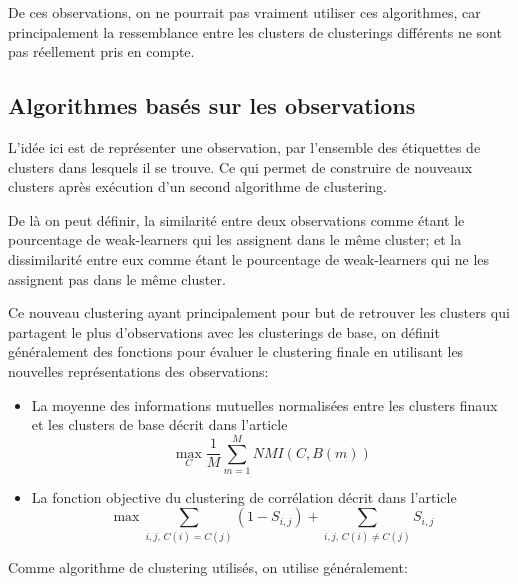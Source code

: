 \documentclass[12pt, french, latin.medieval, a4paper]{report}
\begin{document}
    De ces observations, on ne pourrait pas vraiment utiliser ces algorithmes,
     car principalement la ressemblance entre les clusters de clusterings différents ne sont pas réellement pris en compte.

    \subsection{Algorithmes basés sur les observations}
    
    L'idée ici est de représenter une observation, par l'ensemble des étiquettes de clusters dans lesquels il se trouve. Ce qui permet de construire de nouveaux clusters après
    exécution d'un second algorithme de clustering.

    De là on peut définir, la similarité entre deux observations comme étant le pourcentage de weak-learners qui les assignent dans le même cluster;
    et la dissimilarité entre eux comme étant le pourcentage de weak-learners qui ne les assignent pas dans le même cluster.

    Ce nouveau clustering ayant principalement pour but de retrouver les clusters qui partagent le plus d'observations avec les clusterings de base, 
    on définit généralement des fonctions pour évaluer le clustering finale en utilisant les nouvelles représentations des observations:
    \begin{itemize}
        \item La moyenne des informations mutuelles normalisées entre les clusters finaux et les clusters de base décrit dans l'article \cite{strehl2002cluster}
        \begin{equation}
            \max_C \frac{1}{M}\sum_{m=1}^{M} NMI(C, B(m))
        \end{equation}

        \item La fonction objective du clustering de corrélation décrit dans l'article \cite{gionis2007clustering}
        \begin{equation}
            \max \sum_{i,j \text{, } C(i)=C(j)} (1 - S_{i,j}) + \sum_{{i,j} \text{, } C(i) \neq C(j)}  S_{i,j}
        \end{equation}

    \end{itemize}
    
    Comme algorithme de clustering utilisés, on utilise généralement:
    
\end{document}

